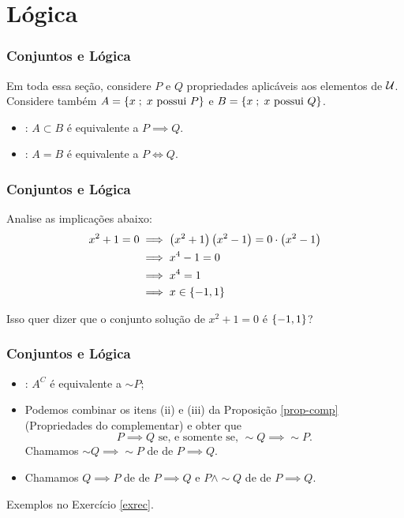 \documentclass[brazil, notheorems, 10pt]{beamer}
\begin{document}
\section{Lógica}
\begin{frame}
\frametitle{Conjuntos e Lógica} %

Em toda essa seção, considere $P$ e $Q$ propriedades aplicáveis aos
elementos de $\mathcal U$. Considere também $A = \left\{x \;;\; x \text{ possui
} P\right\}$ e $B= \left\{x \;;\; x \text{ possui } Q\right\}$.

\begin{itemize}
	\item {}: $A \subset B$ é equivalente a
	$P \implies Q$.
	\item {}: $A=B$ é equivalente a $P
	\iff Q$.
\end{itemize}
\end{frame}
\begin{frame}
\frametitle{Conjuntos e Lógica} %

\begin{Exem}
Analise as implicações abaixo:
\begin{align*}
x^2+1=0 & \implies \left(x^2 +1 \right) \left( x^2-1 \right) = 0
\cdot \left( x^2-1 \right) \\
& \implies x^4 - 1 = 0 \\
& \implies x^4 = 1 \\
& \implies x \in \left\{-1, 1\right\}
\end{align*}

Isso quer dizer que o conjunto solução de $x^2 +1 = 0$ é $\left\{-1,
1\right\}$?
\end{Exem}

\end{frame}
\begin{frame}
\frametitle{Conjuntos e Lógica} %

\begin{itemize}
	\item {}: $A^C$ é equivalente a $\sim P$;
	\item Podemos combinar os itens (ii) e (iii) da Proposição
	\ref{prop-comp} (Propriedades do complementar) e obter que $$P
	\implies Q \text{ se, e somente se, }\sim Q \implies \sim P.$$
	Chamamos $\sim Q \implies \sim P$ de  de $P
	\implies Q$.
	\item Chamamos $Q \implies P$ de  de $P \implies
	Q$ e $P \land \sim Q$ de  de $P \implies Q$.
\end{itemize}
Exemplos no Exercício \ref{exrec}.
\end{frame}
\end{document}
